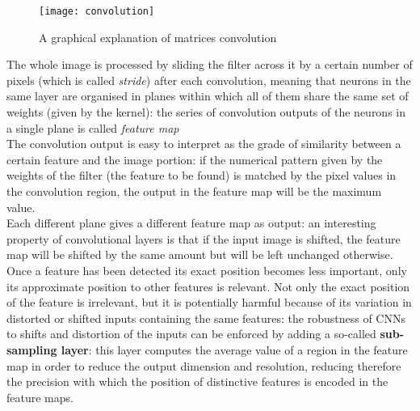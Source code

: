 \documentclass[../main.tex]{subfiles}
\begin{document}
\begin{figure}[H]
 \centering
  \texttt{[image: convolution]}
  \caption{A graphical explanation of matrices convolution \cite{Conv}}
  \label{fig:con}
\end{figure}

The whole image is processed by sliding the filter across it by a certain number of pixels (which is called \textit{stride}) after each convolution, meaning that neurons in the same layer are organised in planes within which all of them share the same set of weights (given by the kernel): the series of convolution outputs of the neurons in a single plane is called \textit{feature map} \cite{LeCun1998} \\
The convolution output is easy to interpret as the grade of similarity between a certain feature and the image portion: if the numerical pattern given by the weights of the filter (the feature to be found) is matched by the pixel values in the convolution region, the output in the feature map will be the maximum value. \\
Each different plane gives a different feature map as output: an interesting property of convolutional layers is that if the input image is shifted, the feature map will be shifted by the same amount but will be left unchanged otherwise.  \\
Once a feature has been detected its exact position becomes less important, only its approximate position to other features is relevant. Not only the exact position of the feature is irrelevant, but it is potentially harmful because of its variation in distorted or shifted inputs containing the same features: the robustness of CNNs to shifts and distortion of the inputs can be enforced by adding a so-called \textbf{sub-sampling layer}: this layer computes the average value of a region in the feature map in order to reduce the output dimension and resolution, reducing therefore the precision with which the position of distinctive features is encoded in the feature maps. \cite{LeCun1998} \\
\end{document}

